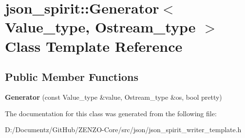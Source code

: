 \hypertarget{classjson__spirit_1_1_generator}{}\section{json\+\_\+spirit\+::Generator$<$ Value\+\_\+type, Ostream\+\_\+type $>$ Class Template Reference}
\label{classjson__spirit_1_1_generator}
\subsection*{Public Member Functions}
\begin{DoxyCompactItemize}
\item 
\mbox{\label{classjson__spirit_1_1_generator_a867f4fc0ee9faa2d470e0ab21d4103f4}} 
{\bfseries Generator} (const Value\+\_\+type \&value, Ostream\+\_\+type \&os, bool pretty)
\end{DoxyCompactItemize}


The documentation for this class was generated from the following file\+:\begin{DoxyCompactItemize}
\item 
D\+:/\+Documentz/\+Git\+Hub/\+Z\+E\+N\+Z\+O-\/\+Core/src/json/json\+\_\+spirit\+\_\+writer\+\_\+template.\+h\end{DoxyCompactItemize}

